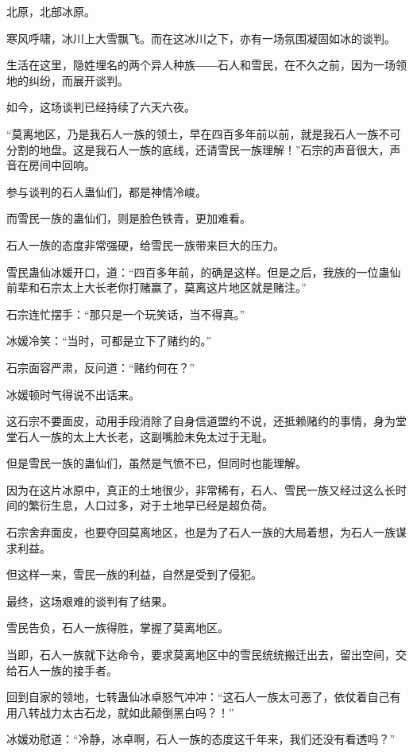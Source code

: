 
\begin{this_body}

北原，北部冰原。

寒风呼啸，冰川上大雪飘飞。而在这冰川之下，亦有一场氛围凝固如冰的谈判。

生活在这里，隐姓埋名的两个异人种族――石人和雪民，在不久之前，因为一场领地的纠纷，而展开谈判。

如今，这场谈判已经持续了六天六夜。

“莫离地区，乃是我石人一族的领土，早在四百多年前以前，就是我石人一族不可分割的地盘。这是我石人一族的底线，还请雪民一族理解！”石宗的声音很大，声音在房间中回响。

参与谈判的石人蛊仙们，都是神情冷峻。

而雪民一族的蛊仙们，则是脸色铁青，更加难看。

石人一族的态度非常强硬，给雪民一族带来巨大的压力。

雪民蛊仙冰媛开口，道：“四百多年前，的确是这样。但是之后，我族的一位蛊仙前辈和石宗太上大长老你打赌赢了，莫离这片地区就是赌注。”

石宗连忙摆手：“那只是一个玩笑话，当不得真。”

冰媛冷笑：“当时，可都是立下了赌约的。”

石宗面容严肃，反问道：“赌约何在？”

冰媛顿时气得说不出话来。

这石宗不要面皮，动用手段消除了自身信道盟约不说，还抵赖赌约的事情，身为堂堂石人一族的太上大长老，这副嘴脸未免太过于无耻。

但是雪民一族的蛊仙们，虽然是气愤不已，但同时也能理解。

因为在这片冰原中，真正的土地很少，非常稀有，石人、雪民一族又经过这么长时间的繁衍生息，人口过多，对于土地早已经是超负荷。

石宗舍弃面皮，也要夺回莫离地区，也是为了石人一族的大局着想，为石人一族谋求利益。

但这样一来，雪民一族的利益，自然是受到了侵犯。

最终，这场艰难的谈判有了结果。

雪民告负，石人一族得胜，掌握了莫离地区。

当即，石人一族就下达命令，要求莫离地区中的雪民统统搬迁出去，留出空间，交给石人一族的接手者。

回到自家的领地，七转蛊仙冰卓怒气冲冲：“这石人一族太可恶了，依仗着自己有用八转战力太古石龙，就如此颠倒黑白吗？！”

冰媛劝慰道：“冷静，冰卓啊，石人一族的态度这千年来，我们还没有看透吗？”


\end{this_body}
